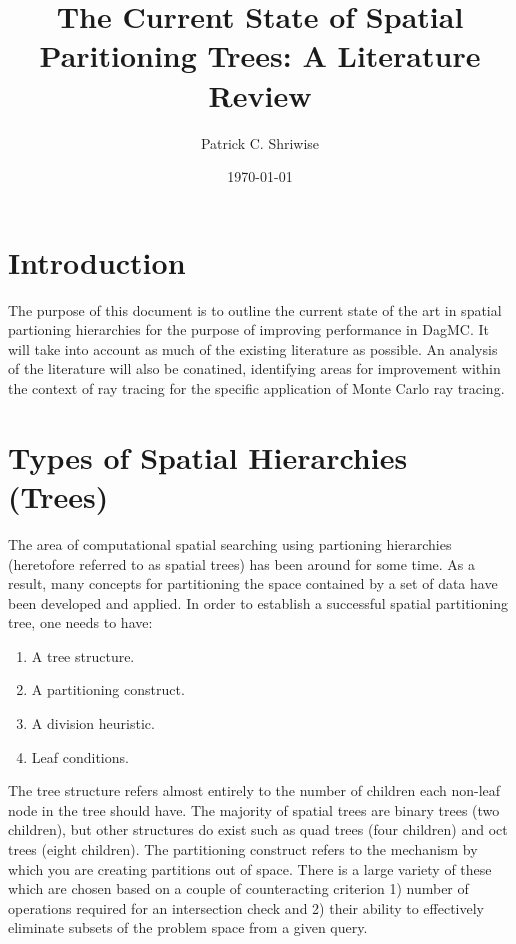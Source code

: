 \documentclass{article}
\title{The Current State of Spatial Paritioning Trees: A Literature Review}
\author{Patrick C. Shriwise}
\date{\today}
\begin{document}
\maketitle

\tableofcontents 

\section{Introduction}

The purpose of this document is to outline the current state of the art in spatial partioning hierarchies for the purpose of improving performance in DagMC. It will take into account as much of the existing literature as possible. An analysis of the literature will also be conatined, identifying areas for improvement within the context of ray tracing for the specific application of Monte Carlo ray tracing.

\section{Types of Spatial Hierarchies (Trees)}

The area of computational spatial searching using partioning hierarchies (heretofore referred to as spatial trees) has been around for some time. As a result, many concepts for partitioning the space contained by a set of data have been developed and applied. In order to establish a successful spatial partitioning tree, one needs to have: 

\begin{enumerate}
  \item A tree structure.
  \item A partitioning construct.
  \item A division heuristic.
  \item Leaf conditions.
\end{enumerate}

The tree structure refers almost entirely to the number of children each non-leaf node in the tree should have. The majority of spatial trees are binary trees (two children), but other structures do exist such as quad trees (four children) and oct trees (eight children). The partitioning construct refers to the mechanism by which you are creating partitions out of space. There is a large variety of these which are chosen based on a couple of counteracting criterion 1) number of operations required for an intersection check and 2) their ability to effectively eliminate subsets of the problem space from a given query.
 
\end{document}
